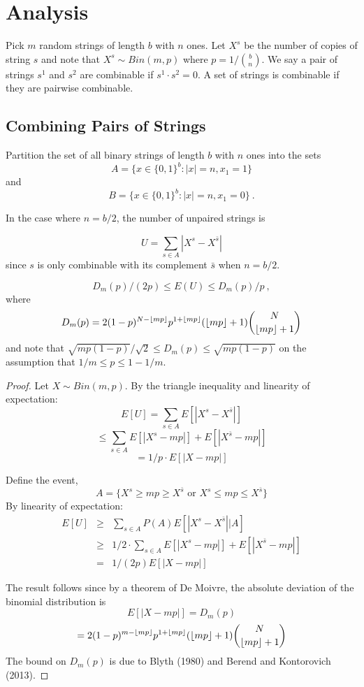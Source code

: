 \section{Analysis}
\label{sec:analysis}

Pick $m$ random strings of length $b$ with $n$ ones.
Let $X^s$ be the number of copies of string $s$ and note that $X^s \sim Bin(m,p)$ where $p=1/{b \choose n}$. 
We say a pair of strings $s^1$ and $s^2$ are combinable if $s^1\cdot s^2=0$. A set of strings is combinable if they are pairwise combinable.

\subsection{Combining Pairs of Strings}

Partition the set of all binary strings of length $b$ with $n$ ones into the sets
\[A=\{x\in \{0,1\}^b: |x|=n, x_1=1\}\] and \[
B=\{x\in \{0,1\}^b: |x|=n, x_1=0\} \ .\]


In the case where $n=b/2$, the number of unpaired strings is 

\[U=\sum_{s\in A} |X^s-X^{\bar{s}}|\] 
since $s$ is only combinable with its complement $\bar{s}$ when $n=b/2$.

\begin{theorem}
\[D_m(p)/(2p) \leq E(U) \leq D_m(p)/p \ ,\]
where 
\[D_m(p)=2(1-p)^{N-\left \lfloor mp \right \rfloor}p^{1+\left \lfloor mp \right \rfloor}(\left \lfloor mp \right \rfloor+1){N\choose \left \lfloor mp \right \rfloor+1}\]
and note that $\sqrt{mp(1-p)}/\sqrt{2} \leq D_m(p)\leq \sqrt{mp(1-p)}$ on the assumption that $1/m\leq p\leq 1-1/m$.
\end{theorem}
\begin{proof}
Let $X\sim Bin(m,p)$.
By the triangle inequality and linearity of expectation:
\[E[U]=\sum_{s\in A} E[|X^s-X^{\bar{s}}|]\]
\[\leq \sum_{s\in A} E[|X^s-mp|] + E[|X^{\bar{s}}-mp|]\]
\[=1/p \cdot E[|X-mp|]\]

Define the event,
\[A=\{X^s\geq mp\geq X^{\bar{s}} \mbox{ or } X^s\leq mp\leq  X^{\bar{s}}\}\]
By linearity of expectation:
\begin{eqnarray*}
E[U]
& \geq & 
\sum_{s\in A} P(A) 
E[|X^s-X^{\bar{s}}| \big | A] \\
& \geq & 1/2 \cdot 
\sum_{s\in A} E[|X^s-mp|] + E[|X^{\bar{s}}-mp|]\\
& = & 1/(2p)  E[|X-mp|]
\end{eqnarray*}

The result follows since by a theorem of De Moivre, the absolute deviation of the binomial distribution is 
\[E[|X-mp|]=D_m(p)\]
\[=2(1-p)^{m-\left \lfloor mp \right \rfloor}p^{1+\left \lfloor mp \right \rfloor}(\left \lfloor mp \right \rfloor+1){N\choose \left \lfloor mp \right \rfloor+1}\] 
The bound on $D_m(p)$ is due to Blyth (1980) and  Berend and  Kontorovich (2013).
\end{proof}

